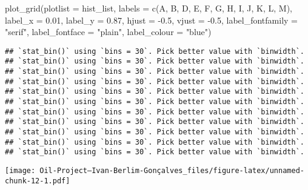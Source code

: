 \documentclass[
]{article}
\newenvironment{Shaded}{\begin{snugshade}}{\end{snugshade}}
\newcommand{\AttributeTok}[1]{\textcolor[rgb]{0.77,0.63,0.00}{#1}}
\newcommand{\FloatTok}[1]{\textcolor[rgb]{0.00,0.00,0.81}{#1}}
\newcommand{\FunctionTok}[1]{\textcolor[rgb]{0.00,0.00,0.00}{#1}}
\newcommand{\NormalTok}[1]{#1}
\newcommand{\SpecialCharTok}[1]{\textcolor[rgb]{0.00,0.00,0.00}{#1}}
\newcommand{\StringTok}[1]{\textcolor[rgb]{0.31,0.60,0.02}{#1}}
\begin{document}
\begin{Shaded}
\begin{Highlighting}[]
\FunctionTok{plot\_grid}\NormalTok{(}\AttributeTok{plotlist =}\NormalTok{ hist\_list,}
          \AttributeTok{labels =} \FunctionTok{c}\NormalTok{(}\StringTok{\textquotesingle{}A\textquotesingle{}}\NormalTok{, }\StringTok{\textquotesingle{}B\textquotesingle{}}\NormalTok{, }\StringTok{\textquotesingle{}D\textquotesingle{}}\NormalTok{, }\StringTok{\textquotesingle{}E\textquotesingle{}}\NormalTok{, }\StringTok{\textquotesingle{}F\textquotesingle{}}\NormalTok{, }\StringTok{\textquotesingle{}G\textquotesingle{}}\NormalTok{, }\StringTok{\textquotesingle{}H\textquotesingle{}}\NormalTok{, }\StringTok{\textquotesingle{}I\textquotesingle{}}\NormalTok{, }\StringTok{\textquotesingle{}J\textquotesingle{}}\NormalTok{, }\StringTok{\textquotesingle{}K\textquotesingle{}}\NormalTok{, }\StringTok{\textquotesingle{}L\textquotesingle{}}\NormalTok{, }\StringTok{\textquotesingle{}M\textquotesingle{}}\NormalTok{),}
          \AttributeTok{label\_x =} \FloatTok{0.01}\NormalTok{,}
          \AttributeTok{label\_y =} \FloatTok{0.87}\NormalTok{,}
          \AttributeTok{hjust =} \SpecialCharTok{{-}}\FloatTok{0.5}\NormalTok{,}
          \AttributeTok{vjust =} \SpecialCharTok{{-}}\FloatTok{0.5}\NormalTok{,}
          \AttributeTok{label\_fontfamily =} \StringTok{"serif"}\NormalTok{,}
          \AttributeTok{label\_fontface =} \StringTok{"plain"}\NormalTok{,}
          \AttributeTok{label\_colour =} \StringTok{"blue"}\NormalTok{)}
\end{Highlighting}
\end{Shaded}

\begin{verbatim}
## `stat_bin()` using `bins = 30`. Pick better value with `binwidth`.
## `stat_bin()` using `bins = 30`. Pick better value with `binwidth`.
## `stat_bin()` using `bins = 30`. Pick better value with `binwidth`.
## `stat_bin()` using `bins = 30`. Pick better value with `binwidth`.
## `stat_bin()` using `bins = 30`. Pick better value with `binwidth`.
## `stat_bin()` using `bins = 30`. Pick better value with `binwidth`.
## `stat_bin()` using `bins = 30`. Pick better value with `binwidth`.
## `stat_bin()` using `bins = 30`. Pick better value with `binwidth`.
## `stat_bin()` using `bins = 30`. Pick better value with `binwidth`.
## `stat_bin()` using `bins = 30`. Pick better value with `binwidth`.
## `stat_bin()` using `bins = 30`. Pick better value with `binwidth`.
\end{verbatim}

\texttt{[image: Oil-Project---Ivan-Berlim-Gonçalves\_files/figure-latex/unnamed-chunk-12-1.pdf]}
\end{document}
